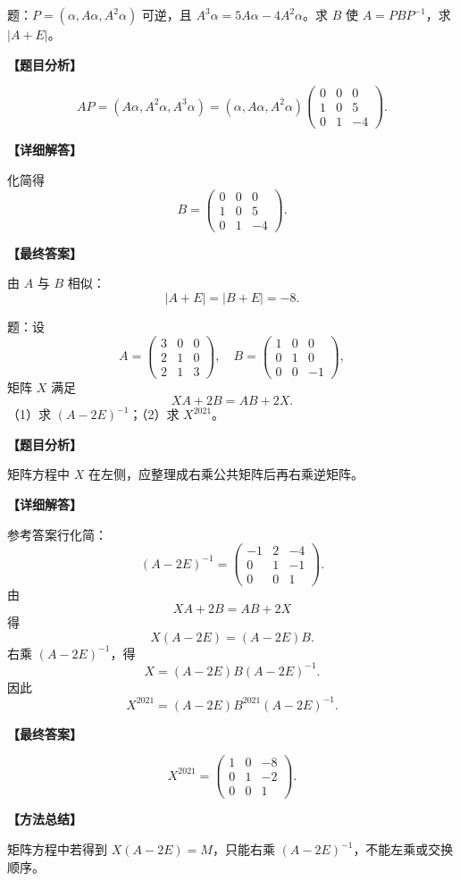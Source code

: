 ﻿\documentclass[11pt,a4paper,UTF8]{ctexart}
\begin{document}
\begin{answerbox}
题：$P=(\alpha,A\alpha,A^2\alpha)$ 可逆，且 $A^3\alpha=5A\alpha-4A^2\alpha$。求 $B$ 使 $A=PBP^{-1}$，求 $|A+E|$。

\textbf{【题目分析】}

\[
AP=(A\alpha,A^2\alpha,A^3\alpha)=(\alpha,A\alpha,A^2\alpha)
\begin{pmatrix}
0&0&0\\
1&0&5\\
0&1&-4
\end{pmatrix}.
\]

\textbf{【详细解答】}

化简得
\[B=\begin{pmatrix}0&0&0\\1&0&5\\0&1&-4\end{pmatrix}.\]

\textbf{【最终答案】}

由 $A$ 与 $B$ 相似：
\[|A+E|=|B+E|=-8.\]
\end{answerbox}
\begin{answerbox}[2020--2021 解答六：矩阵方程 XA+2B=AB+2X]
题：设
\[
A=\begin{pmatrix}3&0&0\\2&1&0\\2&1&3\end{pmatrix},\quad
B=\begin{pmatrix}1&0&0\\0&1&0\\0&0&-1\end{pmatrix},
\]
矩阵 $X$ 满足
\[
XA+2B=AB+2X.
\]
（1）求 $(A-2E)^{-1}$；（2）求 $X^{2021}$。

\textbf{【题目分析】}

矩阵方程中 $X$ 在左侧，应整理成右乘公共矩阵后再右乘逆矩阵。

\textbf{【详细解答】}

参考答案行化简：
\[
(A-2E)^{-1}=
\begin{pmatrix}
-1&2&-4\\
0&1&-1\\
0&0&1
\end{pmatrix}.
\]
由
\[
XA+2B=AB+2X
\]
得
\[
X(A-2E)=(A-2E)B.
\]
右乘 \((A-2E)^{-1}\)，得
\[
X=(A-2E)B(A-2E)^{-1}.
\]
因此
\[
X^{2021}=(A-2E)B^{2021}(A-2E)^{-1}.
\]

\textbf{【最终答案】}

\[
X^{2021}=
\begin{pmatrix}
1&0&-8\\
0&1&-2\\
0&0&1
\end{pmatrix}.
\]

\textbf{【方法总结】}

矩阵方程中若得到 \(X(A-2E)=M\)，只能右乘 \((A-2E)^{-1}\)，不能左乘或交换顺序。
\end{answerbox}
\end{document}
